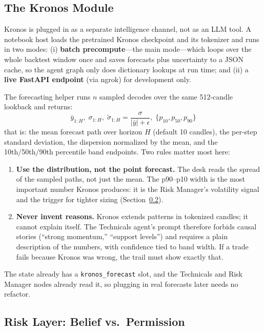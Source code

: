 \documentclass[conference]{IEEEtran}
\begin{document}
\subsection{The Kronos Module}
\label{sec:arch-kronos}

Kronos \cite{shi2025kronos} is plugged in as a separate intelligence channel, not as an LLM tool. A notebook host loads the pretrained Kronos checkpoint and its tokenizer and runs in two modes: (i) \textbf{batch precompute}---the main mode---which loops over the whole backtest window once and saves forecasts plus uncertainty to a JSON cache, so the agent graph only does dictionary lookups at run time; and (ii) a \textbf{live FastAPI endpoint} (via ngrok) for development only.

The forecasting helper runs $n$ sampled decodes over the same 512-candle lookback and returns:
\begin{equation}
\bar{y}_{1:H},\; \sigma_{1:H},\; \tilde{\sigma}_{1:H} = \frac{\sigma}{|\bar{y}| + \epsilon},\; \{p_{10}, p_{50}, p_{90}\}
\label{eq:kronos}
\end{equation}
that is: the mean forecast path over horizon $H$ (default 10 candles), the per-step standard deviation, the dispersion normalized by the mean, and the 10th/50th/90th percentile band endpoints. Two rules matter most here:

\begin{enumerate}[leftmargin=*,itemsep=1pt,topsep=2pt]
  \item \textbf{Use the distribution, not the point forecast.} The desk reads the spread of the sampled paths, not just the mean. The p90--p10 width is the most important number Kronos produces: it is the Risk Manager's volatility signal and the trigger for tighter sizing (Section~\ref{sec:arch-risk}).
  \item \textbf{Never invent reasons.} Kronos extends patterns in tokenized candles; it cannot explain itself. The Technicals agent's prompt therefore forbids causal stories (``strong momentum,'' ``support levels'') and requires a plain description of the numbers, with confidence tied to band width. If a trade fails because Kronos was wrong, the trail must show exactly that.
\end{enumerate}

The state already has a \texttt{kronos\_forecast} slot, and the Technicals and Risk Manager nodes already read it, so plugging in real forecasts later needs no refactor.

\subsection{Risk Layer: Belief vs.\ Permission}
\label{sec:arch-risk}
\end{document}
